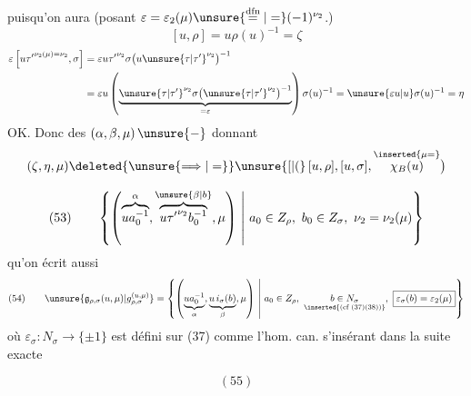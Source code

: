 puisqu'on aura
(posant \(\varepsilon=\varepsilon_2(\mu)
\unsure{\overset{\mathrm{dfn}}{=}|=}
(-1)^{\nu_2}\).)
\[
[u,\rho]=u\rho(u)^{-1}=\zeta
\]
\[
\begin{aligned}
\varepsilon
\left[u{\tau'}^{\nu_2(\mu)=\nu_2},\sigma\right]
&=\varepsilon u{\tau'}^{\nu_2}
\sigma\bigl(u\unsure{\tau|\tau'}^{\nu_2}\bigr)^{-1}\\
&=\varepsilon u
\left(\underbrace{
\unsure{\tau|\tau'}^{\nu_2}
\sigma\bigl(\unsure{\tau|\tau'}^{\nu_2}\bigr)^{-1}
}_{=\varepsilon}\right)\sigma(u)^{-1}
=\unsure{\varepsilon u|u}\sigma(u)^{-1}=\eta
\end{aligned}
\]
OK. Donc
des \((\alpha,\beta,\mu)\,\unsure{-}\)
donnant 
\[
(\zeta,\eta,\mu)\deleted{\unsure{\Longrightarrow|=}}
\unsure{[|(}\,[u,\rho],[u,\sigma],
\overset{\inserted{\mu=}}{\chi_B(u)}\bigr)
\]


\[
(53)\qquad
\left\{\left(
\overbrace{ua_0^{-1}}^{\alpha},
\overbrace{u{\tau'}^{\nu_2}b_0^{-1}}^{\unsure{\beta|b}},
\mu\right)
\ \middle|\ a_0\in Z_\rho,\ b_0\in Z_\sigma,\
\nu_2=\nu_2(\mu)\right\}
\]
\inserted{\[
\bigl(=(ua_0^{-1},ub^{-1},\mu)\unsure{\}}
\quad\text{où}\quad b=b_0{\tau'}^{\unsure{\nu_2}}
\]}
qu'on écrit aussi
\[
(54)\qquad
\unsure{\mathfrak{g}_{\rho,\sigma}(u,\mu)|g_{\rho,\sigma}^{(u,\mu)}}
=
\left\{\left(
\underbrace{ua_0^{-1}}_{\alpha},
\underbrace{u\,i_\sigma(b)}_{\beta},
\mu\right)
\ \middle|\ 
a_0\in Z_\rho,\ 
\underset{\inserted{\text{(cf (37)(38))}}}{b\in N_\sigma},\
\boxed{\varepsilon_\sigma(b)=\varepsilon_2(\mu)}
\right\}
\]
où \(\varepsilon_\sigma:N_\sigma\longrightarrow\{\pm1\}\)
est défini sur (37) comme l'hom. can.
s'insérant dans la suite exacte
\begin{samepage}
\[
(55)
\]
\diagram{\begin{tikzcd}[ampersand replacement=\&]
1\arrow[r]\&Z_\sigma\arrow[r]\&N_\sigma
\arrow[r,"\varepsilon_\sigma"]\&
\underbrace{\{\pm1\}}_{\simeq\{1,\tau'\}}\arrow[r]\&1.
\end{tikzcd}}
\end{samepage}

